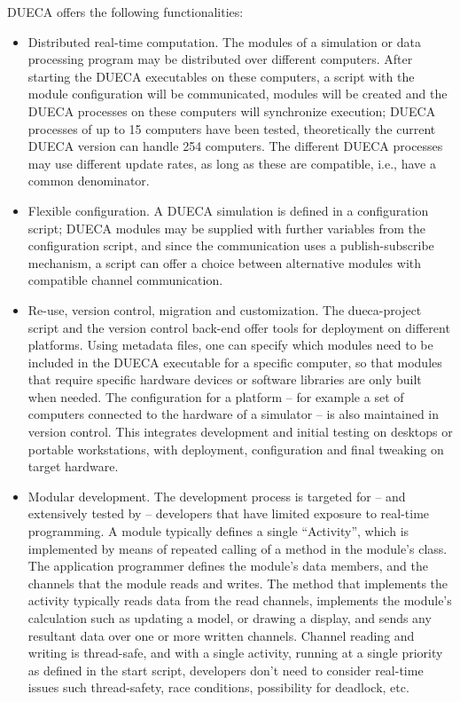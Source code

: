 \documentclass[11pt,a4paper,twoside]{scrartcl}
\begin{document}
DUECA offers the following functionalities:
\begin{itemize}
\item Distributed real-time computation. The modules of a simulation or data processing program may be distributed over different computers. After starting the DUECA executables on these computers, a script with the module configuration will be communicated, modules will be created and the DUECA processes on these computers will synchronize execution; DUECA processes of up to 15 computers have been tested, theoretically the current DUECA version can handle 254 computers. The different DUECA processes may use different update rates, as long as these are compatible, i.e., have a common denominator.
\item Flexible configuration. A DUECA simulation is defined in a configuration script; DUECA modules may be supplied with further variables from the configuration script, and since the communication uses a publish-subscribe mechanism, a script can offer a  choice between alternative modules with compatible channel communication.
\item Re-use, version control, migration and customization. The dueca-project script and the version control back-end offer tools for deployment on different platforms. Using metadata files, one can specify which modules need to be included in the DUECA executable for a specific computer, so that modules that require specific hardware devices or software libraries are only built when needed. The configuration for a platform -- for example a set of computers connected to the hardware of a simulator -- is also maintained in version control. This integrates development and initial testing on desktops or portable workstations, with deployment, configuration and final tweaking on target hardware.
\item Modular development. The development process is targeted for -- and extensively tested by -- developers that have limited exposure to real-time programming. A module typically defines a single ``Activity'', which is implemented by means of repeated calling of a method in the module's class. The application programmer defines the module's data members, and the channels that the module reads and writes. The method that implements the activity typically reads data from the read channels, implements the module's calculation such as updating a model, or drawing a display, and sends any resultant data over one or more written channels. Channel reading and writing is thread-safe, and with a single activity, running at a single priority as defined in the start script, developers don't need to consider real-time issues such thread-safety, race conditions, possibility for deadlock, etc.

\end{itemize}
\end{document}
